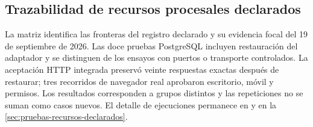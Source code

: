 \subsection{Trazabilidad de recursos procesales declarados}\label{sec:matriz-recursos-declarados}

La matriz identifica las fronteras del registro declarado y su evidencia focal del 19 de septiembre de 2026. Las doce pruebas PostgreSQL incluyen restauración del adaptador y se distinguen de los ensayos con puertos o transporte controlados. La aceptación HTTP integrada preservó veinte respuestas exactas después de restaurar; tres recorridos de navegador real aprobaron escritorio, móvil y permisos. Los resultados corresponden a grupos distintos y las repeticiones no se suman como casos nuevos. El detalle de ejecuciones permanece en  y en la \cref{sec:pruebas-recursos-declarados}.

